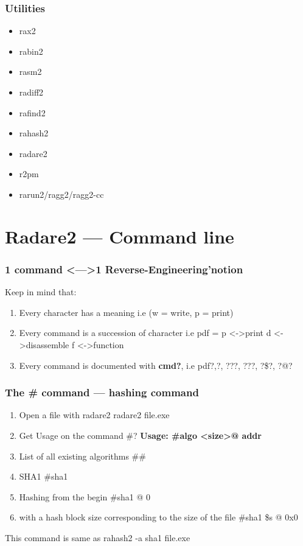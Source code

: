 \documentclass[10pt,pdf,utf8,english,compress,hyperref={unicode}]{beamer}
\begin{document}
\begin{frame}[fragile]
  \frametitle{Utilities}
     \begin{itemize}
        \item rax2
        \item rabin2
        \item rasm2
        \item radiff2
        \item rafind2
        \item rahash2
        \item \alert{radare2}
				\item r2pm
        \item rarun2/ragg2/ragg2-cc
      \end{itemize}
\end{frame}

\section{Radare2 — Command line}

\begin{frame}[fragile]
  \frametitle{1 command \textless—\textgreater 1 Reverse-Engineering'notion}
  Keep in mind that:
  \begin{enumerate}
  \item Every character has a meaning i.e \alert{(w = write, p = print)}
  \item Every command is a succession of character i.e \alert{pdf = p \textless-\textgreater print d \textless-\textgreater disassemble f \textless-\textgreater function }
  \item Every command is documented with \textbf{cmd?}, i.e \alert{pdf?},\alert{?}, \alert{???}, \alert{???}, \alert{?\$?}, \alert{?@?}
  \end{enumerate}
\end{frame}

\begin{frame}[fragile]
  \frametitle{The \# command — hashing command}
  \begin{enumerate}
  \item Open a file with radare2 \alert{radare2 file.exe}
  \item Get Usage on the command \alert{\#?} \textbf{Usage: \#algo \textless size\textgreater @ addr}
  \item List of all existing algorithms \alert{\#\#}
  \item SHA1 \alert{\#sha1}
  \item Hashing from the begin \alert{\#sha1 @ 0}
  \item with a hash block size corresponding to the size of the file \alert{\#sha1 \$s @ 0x0}
 \end{enumerate}
This command is same as rahash2 -a sha1 file.exe
\end{frame}
\end{document}
